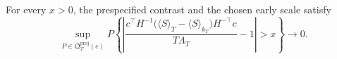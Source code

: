 For every \(x>0\), the prespecified contrast and the chosen early scale satisfy
\[
 \sup_{P\in\mathfrak Q_T^{\mathrm{proj}}(c)}
 P\!\left\{
 \left|
 \frac{c^\top H^{-1}\bigl(\langle S\rangle_T-\langle S\rangle_{k_T}\bigr)H^{-\top}c}
 {T\Lambda_T}-1
 \right|>x
 \right\}\longrightarrow0.
\]